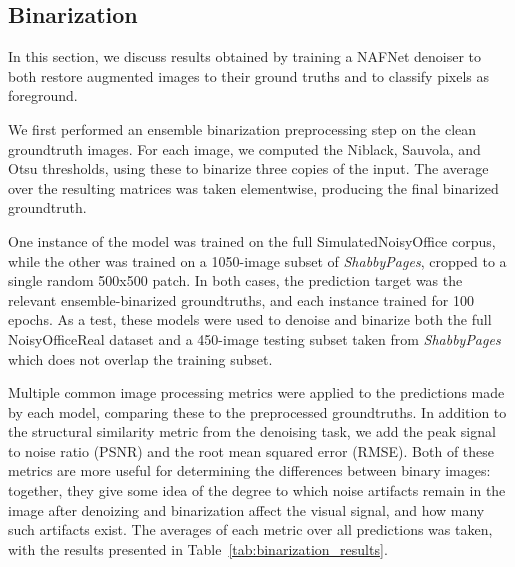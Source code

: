 \documentclass[runningheads]{llncs}
\begin{document}
\subsection{Binarization}
In this section, we discuss results obtained by training a NAFNet denoiser to both restore augmented images to their ground truths and to classify pixels as foreground.

We first performed an ensemble binarization preprocessing step on the clean groundtruth images.
For each image, we computed the Niblack, Sauvola, and Otsu thresholds, using these to binarize three copies of the input. The average over the resulting matrices was taken elementwise, producing the final binarized groundtruth.

One instance of the model was trained on the full SimulatedNoisyOffice corpus, while the other was trained on a 1050-image subset of \emph{ShabbyPages}, cropped to a single random 500x500 patch. In both cases, the prediction target was the relevant ensemble-binarized groundtruths, and each instance trained for 100 epochs.
As a test, these models were used to denoise and binarize both the full NoisyOfficeReal dataset and a 450-image testing subset taken from \emph{ShabbyPages} which does not overlap the training subset.

Multiple common image processing metrics were applied to the predictions made by each model, comparing these to the preprocessed groundtruths.
In addition to the structural similarity metric from the denoising task, we add the peak signal to noise ratio (PSNR) and the root mean squared error (RMSE). Both of these metrics are more useful for determining the differences between binary images: together, they give some idea of the degree to which noise artifacts remain in the image after denoizing and binarization affect the visual signal, and how many such artifacts exist.
The averages of each metric over all predictions was taken, with the results presented in Table~\ref{tab:binarization_results}.

\begin{table}[]
    \centering
    \caption{Document image binarization performance of a NAFNet model trained and tested on \emph{ShabbyPages} and \emph{NoisyOffice}.}
    \label{tab:binarization_results}
\end{table}
\end{document}
